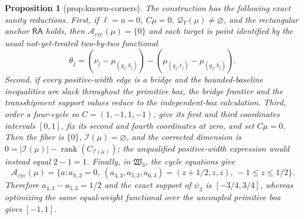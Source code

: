 \documentclass{article}
\newtheorem{proposition}{Proposition}
\begin{document}
\begin{proposition}[prop:known-corners]\label{prop:known-corners}
The construction has the following exact sanity reductions.  First, if \(\ell=u=0\), \(C\mu=0\), \(\mathcal Q_Y(\mu)\ne\varnothing\), and the rectangular anchor \(\mathsf{RA}\) holds, then \(\mathcal A_{\mathrm{cyc}}(\mu)=\{0\}\) and each target is point identified by the usual not-yet-treated two-by-two functional
\[
 \theta_j=(\nu_j-\mu_{(g_j,b_j)})-(\mu_{(q_j,t_j)}-\mu_{(q_j,b_j)}).
\]
Second, if every positive-width edge is a bridge and the bounded-baseline inequalities are slack throughout the primitive box, the bridge frontier and the transshipment support values reduce to the independent-box calculation.  Third, order a four-cycle so \(C=(1,-1,1,-1)\), give its first and third coordinates intervals \([0,1]\), fix its second and fourth coordinates at zero, and set \(C\mu=0\).  Then the fiber is \(\{0\}\), \(\mathcal I(\mu)=\varnothing\), and the corrected dimension is \(0=|\mathcal I(\mu)|-\operatorname{rank}(C_{\mathcal I(\mu)})\); the unqualified positive-width expression would instead equal \(2-1=1\).  Finally, in \(\mathfrak W_3\), the cycle equations give
\[
 \mathcal A_{\mathrm{cyc}}(\mu)=\{a:a_{h,2}=0,\ (a_{4,3},a_{5,3},a_{6,3})=(z+1/2,z,z),\ -1\le z\le1/2\}.
\]
Therefore \(a_{4,3}-a_{5,3}=1/2\) and the exact support of \(\psi_3\) is \([-3/4,3/4]\), whereas optimizing the same equal-weight functional over the uncoupled primitive box gives \([-1,1]\).
\end{proposition}
\end{document}
